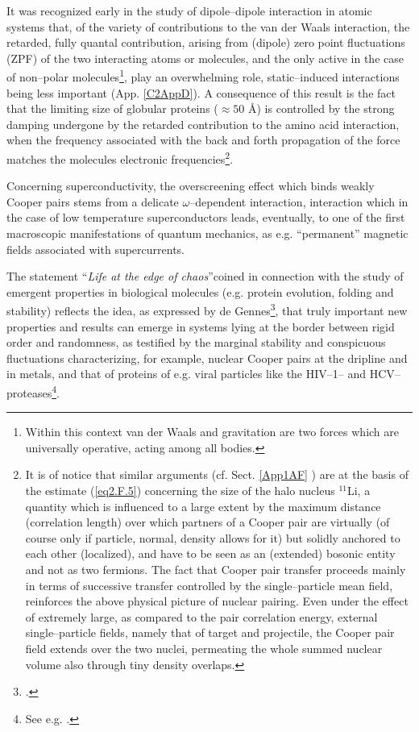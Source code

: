 \begin{subappendices}
It was recognized early in the study of dipole--dipole interaction in atomic systems that, of the variety of contributions to the van der Waals interaction, the retarded, fully quantal contribution, arising from (dipole) zero point fluctuations (ZPF) of the two interacting atoms or molecules, and the only active  in the case of non--polar molecules\footnote{Within this context van der Waals and gravitation are two forces which are universally operative, acting among all bodies.}, play an overwhelming role, static--induced interactions being less important (App. \ref{C2AppD}). A consequence of this result is the fact that the limiting size of globular proteins ($\approx 50$ \AA) is controlled by the strong damping undergone by the retarded contribution to the amino acid interaction, when the frequency associated with the  back and forth propagation of the force  matches the molecules electronic frequencies\footnote{It is of notice that similar arguments (cf. Sect. \ref{App1AF} ) are at the basis of the estimate (\ref{eq2.F.5}) concerning the size of the halo nucleus $^{11}$Li, a quantity which is influenced to a large extent by the maximum distance (correlation length) over which  partners of a Cooper pair are virtually (of course only if particle, normal, density allows for it) but solidly anchored to each other (localized), and have to be seen as an (extended) bosonic entity and not as two fermions. The fact that Cooper pair transfer proceeds mainly in terms of successive transfer controlled by the single--particle mean field, reinforces the above physical picture of nuclear pairing. Even under the effect of extremely large, as compared to the pair correlation energy, external single--particle fields, namely that of target and projectile, the Cooper pair field extends over the two nuclei, permeating the whole summed nuclear volume also through  tiny density overlaps.}.


Concerning superconductivity, the overscreening effect which binds weakly Cooper pairs stems from a delicate $\omega$--dependent interaction, interaction which in the case of low temperature superconductors leads, eventually, to one of the first macroscopic manifestations of quantum mechanics, as e.g. ``permanent'' magnetic fields associated with supercurrents.

The statement ``\textit{Life at the edge of chaos}''coined in connection with the study of emergent properties in biological molecules (e.g. protein evolution, folding and stability) reflects the idea, as expressed by de Gennes\footnote{\cite{deGennes:94}.}, that truly important new properties and results can emerge in systems lying at the border between rigid order and randomness, as testified by the marginal stability and conspicuous fluctuations characterizing, for example, nuclear Cooper pairs at the dripline and in metals, and that of proteins of e.g.  viral particles like the HIV--1-- and HCV--proteases\footnote{See e.g. \cite{Broglia:13b}.}.



\end{subappendices}
